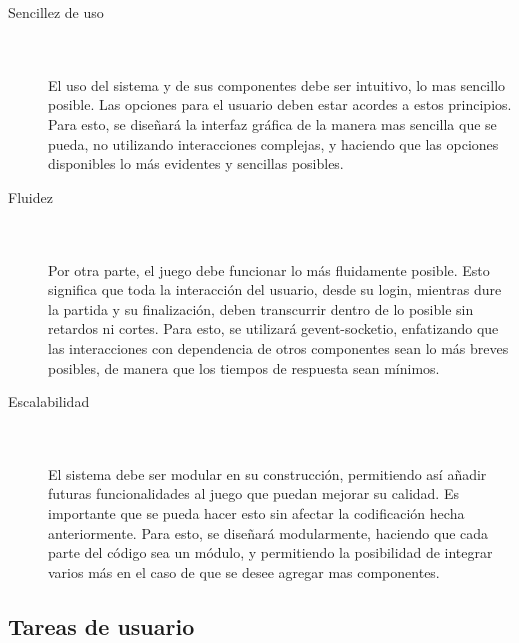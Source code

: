 \documentclass[a4paper,11pt]{article}
\begin{document}
\begin{description}
	\item[Sencillez de uso] \hfill \\ \\
	El uso del sistema y de sus componentes debe ser intuitivo, lo mas 
	sencillo posible. Las opciones para el usuario deben estar acordes
	a estos principios.
	Para esto, se diseñará la interfaz gráfica de la manera mas sencilla
	que se pueda, no utilizando interacciones complejas, y haciendo
	que las opciones disponibles lo más evidentes y sencillas posibles. 
	\item[Fluidez] \hfill \\ \\
	Por otra parte, el juego debe funcionar lo más fluidamente posible.
	Esto significa que toda la interacción del usuario, desde su login, 
	mientras dure la partida y su finalización, deben transcurrir dentro 
	de lo posible sin retardos ni cortes.
	Para esto, se utilizará gevent-socketio, enfatizando que las 
	interacciones con dependencia de otros componentes
	sean lo más breves posibles, de manera que los tiempos de respuesta
	sean mínimos. 
	\item[Escalabilidad] \hfill \\ \\
	El sistema debe ser modular en su construcción, permitiendo así 
	añadir futuras funcionalidades al juego que puedan mejorar su
	calidad. Es importante que se pueda hacer esto sin afectar la 
	codificación hecha anteriormente.
	Para esto, se diseñará modularmente, haciendo que cada parte del código
	sea un módulo, y permitiendo la posibilidad de integrar varios más
	en el caso de que se desee agregar mas componentes.

\end{description}
\newpage

\subsection{Tareas de usuario}
\end{document}
